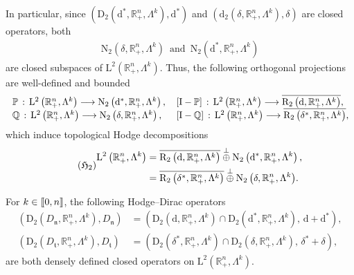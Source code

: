\documentclass[AHL,Unicode,longabstracts,published]{cedram}
\newcommand{\bbP}{\mathbb{P}}
\newcommand{\bbR}{\mathbb{R}}
\newcommand{\bbQ}{\mathbb{Q}}
\newcommand{\rmd}{\mathrm{d}}
\newcommand{\rmD}{\mathrm{D}}
\newcommand{\rmL}{\mathrm{L}}
\newcommand{\rmR}{\mathrm{R}}
\newcommand{\rmN}{\mathrm{N}}
\newcommand{\rmI}{\mathrm{I}}
\newcommand{\fkn}{\mathfrak{n}}
\newcommand{\fkt}{\mathfrak{t}}
\newcommand{\llbracket}{\mathopen{[\mkern -2.7mu[}}
\newcommand{\rrbracket}{\mathclose{]\mkern -2.7mu]}}
\newcommand{\llb}{\llbracket}
\newcommand{\rrb}{\rrbracket}
\begin{document}
In particular, since $(\rmD_2(\rmd^\ast,\bbR^n_+,\Lambda^{k}),\rmd^\ast)$ and $(\rmd_2(\delta,\bbR^n_+,\Lambda^{k}),\delta)$ are closed operators, both
\begin{align*}
\rmN_2\left(\delta,\bbR^n_+,\Lambda^{k}\right) \,\text{ and }\,\rmN_2\left(\rmd^\ast,\bbR^n_+,\Lambda^{k}\right)
\end{align*}
are closed subspaces of $\rmL^2(\bbR^n_+,\Lambda^{k})$. Thus, the following orthogonal projections are well-defined and bounded
\begin{align*}
\mkern-15mu\begin{array}{cll}
&\bbP\,:\,\rmL^2\left(\bbR^n_+,\Lambda^{k}\right)\longrightarrow \rmN_2\left(\rmd^\ast,\bbR^n_+,\Lambda^{k}\right),\,& [\rmI -\bbP]\,:\,\rmL^2\left(\bbR^n_+,\Lambda^{k}\right)\longrightarrow \overline{\rmR _2\left(\rmd,\bbR^n_+,\Lambda^{k}\right)},\\
&\bbQ\,:\,\rmL^2\left(\bbR^n_+,\Lambda^{k}\right)\longrightarrow \rmN_2\left(\delta,\bbR^n_+,\Lambda^{k}\right),\,& [\rmI -\bbQ]\,:\,\rmL^2\left(\bbR^n_+,\Lambda^{k}\right)\longrightarrow \overline{\rmR _2\left(\delta^\ast,\bbR^n_+,\Lambda^{k}\right)},
\end{array}
\end{align*}
which induce topological Hodge decompositions
\begin{equation}\label{HodgeDecompL2}
\tag{$\mathfrak{H}_2$}
\begin{split}
\rmL^{2}\left(\bbR^n_+,\Lambda^k\right) &= \overline{\rmR _2\left(\rmd,\bbR^n_+,\Lambda^k\right)}\overset{\perp}{\oplus} \rmN_2\left(\rmd^\ast,\bbR^n_+,\Lambda^k\right),\\
&= \overline{\rmR_2\left(\delta^\ast,\bbR^n_+,\Lambda^k\right)} \overset{\perp}{\oplus} {\rmN_2\left(\delta,\bbR^n_+,\Lambda^k\right)} .
\end{split}
\end{equation}


\begin{lemm}
For $k\in\llb0,n\rrb$, the following Hodge--Dirac operators
\begin{align*}
\left(\rmD_2\left(D_{\fkn},\bbR^n_+,\Lambda^k\right),D_{\fkn}\right)&= \left(\rmD_2\left({\rmd},\bbR^n_+,\Lambda^k\right)\cap\rmD_2\left({\rmd^\ast},\bbR^n_+,\Lambda^k\right),\, \rmd+\rmd^\ast\right),\\
\left(\rmD_2\left(D_{\fkt},\bbR^n_+,\Lambda^k\right),D_{\fkt}\right)&= \left(\rmD_2\left({\delta^\ast},\bbR^n_+,\Lambda^k\right)\cap\rmD_2\left({\delta},\bbR^n_+,\Lambda^k\right),\, \delta^\ast+\delta\right),
\end{align*}
are both densely defined closed operators on $\rmL^2(\bbR^n_+,\Lambda^k)$.
\end{lemm}
\end{document}
